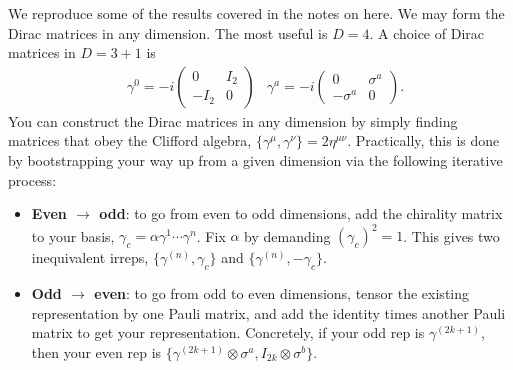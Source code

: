\documentclass[11pt]{article}
\begin{document}
We reproduce some of the results covered in the notes on
 here. We may form the Dirac matrices
in any dimension. The most useful is $D = 4$. A choice
of Dirac matrices in $D = 3 + 1$ is
\begin{align*}
    & \gamma^0 = - i \begin{pmatrix}
        0 & I_2\\
        - I_2 & 0
    \end{pmatrix}
    & \gamma^a = -i \begin{pmatrix}
        0 & \sigma^a\\
        - \sigma^a & 0
    \end{pmatrix}.
\end{align*}
You can construct the Dirac matrices in any dimension by
simply finding matrices that obey the Clifford algebra,
$\{ \gamma^\mu, \gamma^\nu \} = 2 \eta^{\mu \nu}$. Practically,
this is done by bootstrapping your way up from a given dimension
via the following iterative process:
\begin{itemize}
    \item \textbf{Even $\to$ odd}: to go from even to odd dimensions,
    add the chirality matrix to your basis, $\gamma_c = \alpha \gamma^1 \cdots \gamma^n$.
    Fix $\alpha$ by demanding $(\gamma_c)^2 = 1$. This gives two inequivalent
    irreps, $\{ \gamma^{(n)}, \gamma_c \}$ and $\{ \gamma^{(n)}, - \gamma_c \}$.
    \item \textbf{Odd $\to$ even}: to go from odd to even dimensions,
    tensor the existing representation by one Pauli matrix, and
    add the identity times another Pauli matrix to get your representation.
    Concretely, if your odd rep is $\gamma^{(2k + 1)}$, then your even rep 
    is $\{ \gamma^{(2k + 1)} \otimes \sigma^a, I_{2k} \otimes \sigma^b \}$.
\end{itemize}
\end{document}

